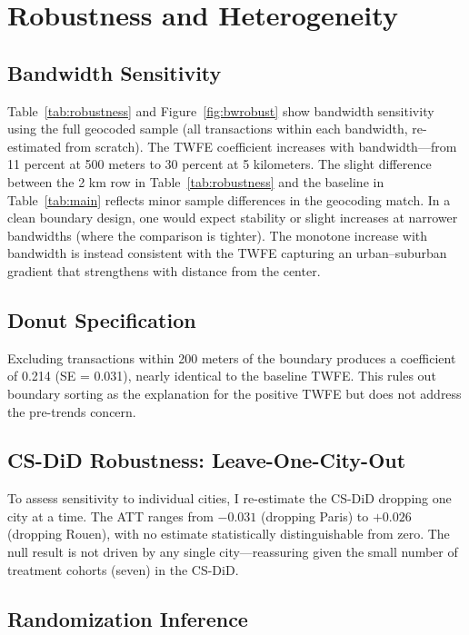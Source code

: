\documentclass[12pt]{article}
\begin{document}
\section{Robustness and Heterogeneity} \label{sec:robustness}

\subsection{Bandwidth Sensitivity}



Table~\ref{tab:robustness} and Figure~\ref{fig:bwrobust} show bandwidth sensitivity using the full geocoded sample (all transactions within each bandwidth, re-estimated from scratch). The TWFE coefficient increases with bandwidth---from 11 percent at 500 meters to 30 percent at 5 kilometers. The slight difference between the 2 km row in Table~\ref{tab:robustness} and the baseline in Table~\ref{tab:main} reflects minor sample differences in the geocoding match. In a clean boundary design, one would expect stability or slight increases at narrower bandwidths (where the comparison is tighter). The monotone increase with bandwidth is instead consistent with the TWFE capturing an urban--suburban gradient that strengthens with distance from the center.

\subsection{Donut Specification}

Excluding transactions within 200 meters of the boundary produces a coefficient of 0.214 (SE = 0.031), nearly identical to the baseline TWFE. This rules out boundary sorting as the explanation for the positive TWFE but does not address the pre-trends concern.

\subsection{CS-DiD Robustness: Leave-One-City-Out}

To assess sensitivity to individual cities, I re-estimate the CS-DiD dropping one city at a time. The ATT ranges from $-0.031$ (dropping Paris) to $+0.026$ (dropping Rouen), with no estimate statistically distinguishable from zero. The null result is not driven by any single city---reassuring given the small number of treatment cohorts (seven) in the CS-DiD.

\subsection{Randomization Inference}
\end{document}
